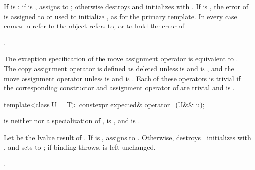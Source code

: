 \begin{itemdescr}

\pnum
\effects
If  is : if  is , assigns  to ; otherwise destroys  and initializes  with . If  is , the error of  is assigned to or used to initialize , as for the primary template. In every case  comes to refer to the object  refers to, or to hold the error of .

\pnum
\returns
{}.

\pnum
\remarks
The exception specification of the move assignment operator is equivalent to . The copy assignment operator is defined as deleted unless  is  and  is , and the move assignment operator unless  is  and  is . Each of these operators is trivial if the corresponding constructor and assignment operator of  are trivial and  is .
\end{itemdescr}

%
\begin{itemdecl}
template<class U = T>
  constexpr expected& operator=(U&& u);
\end{itemdecl}

\begin{itemdescr}
\pnum
\constraints
{} is neither  nor a specialization of ,  is , and  is .

\pnum
\effects
Let  be the lvalue result of . If  is , assigns  to . Otherwise, destroys , initializes  with , and sets  to ; if binding  throws,  is left unchanged.

\pnum
\returns
{}.
\end{itemdescr}

